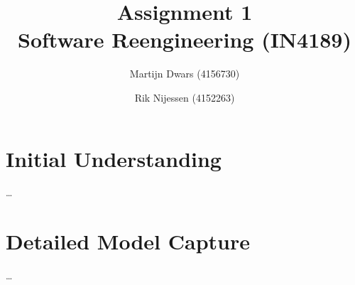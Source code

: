 \documentclass{article}
\author{Martijn Dwars (4156730) \and Rik Nijessen (4152263)}
\title{Assignment 1 \\ Software Reengineering (IN4189)}
\begin{document}
\maketitle

\section{Initial Understanding}
\ldots

\section{Detailed Model Capture}
\ldots
\end{document}
